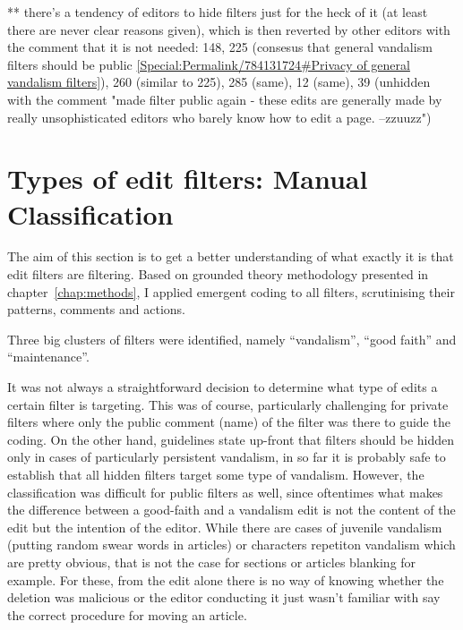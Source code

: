   ** there's a tendency of editors to hide filters just for the heck of it (at least there are never clear reasons given), which is then reverted by other editors with the comment that it is not needed: 148, 225 (consesus that general vandalism filters should be public \url{[Special:Permalink/784131724#Privacy of general vandalism filters]}), 260 (similar to 225), 285 (same), 12 (same), 39 (unhidden with the comment "made filter public again - these edits are generally made by really unsophisticated editors who barely know how to edit a page. --zzuuzz")


\section{Types of edit filters: Manual Classification}
\label{sec:manual-classification}

The aim of this section is to get a better understanding of what exactly it is that edit filters are filtering.
Based on grounded theory methodology presented in chapter~\ref{chap:methods}, I applied emergent coding to all filters, scrutinising their patterns, comments and actions.

Three big clusters of filters were identified, namely ``vandalism'', ``good faith'' and ``maintenance''. %

It was not always a straightforward decision to determine what type of edits a certain filter is targeting.
This was of course, particularly challenging for private filters where only the public comment (name) of the filter was there to guide the coding.
On the other hand, guidelines state up-front that filters should be hidden only in cases of particularly persistent vandalism, in so far it is probably safe to establish that all hidden filters target some type of vandalism.
However, the classification was difficult for public filters as well, since oftentimes what makes the difference between a good-faith and a vandalism edit is not the content of the edit but the intention of the editor.
While there are cases of juvenile vandalism (putting random swear words in articles) or characters repetiton vandalism which are pretty obvious, that is not the case for sections or articles blanking for example.
For these, from the edit alone there is no way of knowing whether the deletion was malicious or the editor conducting it just wasn't familiar with say the correct procedure for moving an article.


